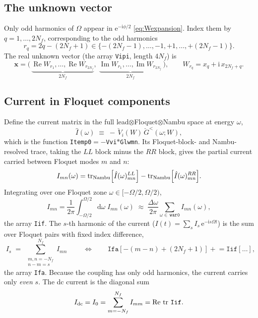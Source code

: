 \documentclass[11pt,a4paper]{article}
\newcommand{\dd}{\mathrm{d}}
\newcommand{\ii}{\mathrm{i}}
\newcommand{\ee}{\mathrm{e}}
\newcommand{\tr}{\operatorname{tr}}
\newcommand{\Real}{\operatorname{Re}}
\newcommand{\Imag}{\operatorname{Im}}
\newcommand{\Om}{\Omega}
\newcommand{\Wm}{W}
\begin{document}
\subsection{The unknown vector}

Only odd harmonics of $\Om$ appear in $\ee^{-\ii\phi/2}$
\eqref{eq:Wexpansion}.  Index them by $q=1,\dots,2N_f$, corresponding to the odd
harmonics
\begin{equation}
  r_q = 2q-(2N_f+1)\in\{-(2N_f-1),\dots,-1,+1,\dots,+(2N_f-1)\}.
\end{equation}
The real unknown vector (the array \texttt{Vipi}, length $4N_f$) is
\begin{equation}
  \mathbf x = \big(\,\underbrace{\Real \Wm_{r_1},\dots,\Real \Wm_{r_{2N_f}}}_{2N_f},\;
                     \underbrace{\Imag \Wm_{r_1},\dots,\Imag \Wm_{r_{2N_f}}}_{2N_f}\,\big),
  \qquad
  \Wm_{r_q}=x_q+\ii\,x_{2N_f+q}.
  \label{eq:unknowns}
\end{equation}

\subsection{Current in Floquet components}
\label{sec:current_floquet}

Define the current matrix in the full lead$\otimes$Floquet$\otimes$Nambu space at
energy $\omega$,
\begin{equation}
  \hat I(\omega) \;\equiv\; -\,\check V_i(\Wm)\,\check G^<(\omega;\Wm),
  \label{eq:Ihat}
\end{equation}
which is the function \texttt{Itemp0}$=-$\texttt{Vvi}$*$\texttt{Glwmn}.  Its
Floquet-block- and Nambu-resolved trace, taking the $LL$ block minus the $RR$
block, gives the partial current carried between Floquet modes $m$ and $n$:
\begin{equation}
  I_{mn}(\omega) =
  \tr_{\rm Nambu}\!\Big[\hat I(\omega)^{LL}_{mn}\Big]
  -\tr_{\rm Nambu}\!\Big[\hat I(\omega)^{RR}_{mn}\Big].
  \label{eq:Imn_omega}
\end{equation}
Integrating over one Floquet zone $\omega\in[-\Om/2,\Om/2)$,
\begin{equation}
  I_{mn} = \frac{1}{2\pi}\int_{-\Om/2}^{\Om/2}\!\dd\omega\;I_{mn}(\omega)
         \;\approx\; \frac{\Delta\omega}{2\pi}\sum_{\omega\in\,\texttt{war0}} I_{mn}(\omega),
  \label{eq:Imn}
\end{equation}
the array \texttt{Iif}.  The $s$-th harmonic of the current
($I(t)=\sum_s I_s\,\ee^{-\ii s\Om t}$) is the sum over Floquet pairs with fixed
index difference,
\begin{equation}
  \boxed{\;I_s \;=\; \sum_{\substack{m,n=-N_f\\ n-m=s}}^{N_f} I_{mn}\;}
  \qquad\Longleftrightarrow\qquad
  \texttt{Ifa}[-(m-n)+(2N_f{+}1)] \mathrel{+}= \texttt{Iif}[\dots],
  \label{eq:Is}
\end{equation}
the array \texttt{Ifa}.  Because the coupling has only odd harmonics, the current
carries only \emph{even} $s$.  The dc current is the diagonal sum
\begin{equation}
  I_{\rm dc} = I_0 = \sum_{m=-N_f}^{N_f} I_{mm} = \Real\,\tr\,\texttt{Iif}.
\end{equation}
\end{document}
